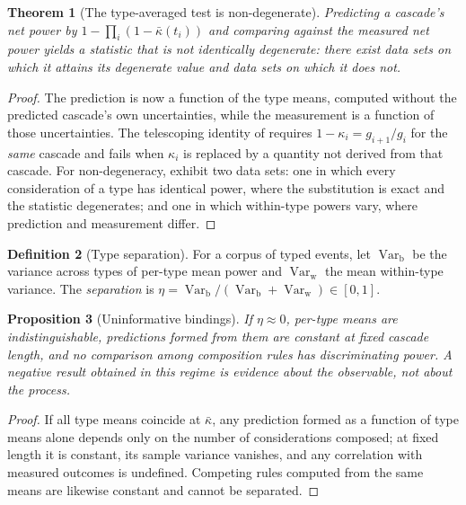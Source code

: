 \documentclass[11pt,a4paper]{article}
\theoremstyle{clstyle}
\newtheorem{theorem}{Theorem}[section]
\newtheorem{proposition}[theorem]{Proposition}
\theoremstyle{definition}
\newtheorem{definition}[theorem]{Definition}
\theoremstyle{remark}
\DeclareMathOperator{\Var}{Var}
\begin{document}
\begin{theorem}[The type-averaged test is non-degenerate]
\label{thm:typeavg}
Predicting a cascade's net power by $1-\prod_i(1-\bar\kappa(t_i))$ and
comparing against the measured net power yields a statistic that is not
identically degenerate: there exist data sets on which it attains its
degenerate value and data sets on which it does not.
\end{theorem}

\begin{proof}
The prediction is now a function of the type means, computed without the
predicted cascade's own uncertainties, while the measurement is a function of
those uncertainties. The telescoping identity of 
requires $1-\kappa_i=g_{i+1}/g_i$ for the \emph{same} cascade and fails when
$\kappa_i$ is replaced by a quantity not derived from that cascade. For
non-degeneracy, exhibit two data sets: one in which every consideration of a
type has identical power, where the substitution is exact and the statistic
degenerates; and one in which within-type powers vary, where prediction and
measurement differ.
\end{proof}

\begin{definition}[Type separation]
\label{def:separation}
For a corpus of typed events, let $\Var_{\mathrm{b}}$ be the variance across
types of per-type mean power and $\Var_{\mathrm{w}}$ the mean within-type
variance. The \emph{separation} is
$\eta=\Var_{\mathrm{b}}/(\Var_{\mathrm{b}}+\Var_{\mathrm{w}})\in[0,1]$.
\end{definition}

\begin{proposition}[Uninformative bindings]
\label{prop:uninformative}
If $\eta\approx0$, per-type means are indistinguishable, predictions formed
from them are constant at fixed cascade length, and no comparison among
composition rules has discriminating power. A negative result obtained in
this regime is evidence about the observable, not about the process.
\end{proposition}

\begin{proof}
If all type means coincide at $\bar\kappa$, any prediction formed as a
function of type means alone depends only on the number of considerations
composed; at fixed length it is constant, its sample variance vanishes, and
any correlation with measured outcomes is undefined. Competing rules computed
from the same means are likewise constant and cannot be separated.
\end{proof}
\end{document}
